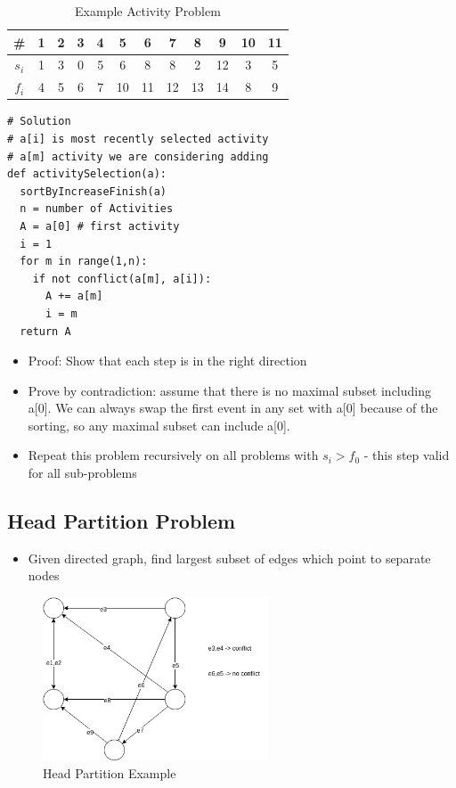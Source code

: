 \documentclass[12pt, letter]{article}
\begin{document}
\begin{table}
\begin{center}
\begin{tabular}{|c|c|c|c|c|c|c|c|c|c|c|c|}
\hline
# & 1 & 2 & 3 & 4 & 5 & 6 & 7 & 8 & 9 & 10 & 11 \\
\hline
$s_i$ & 1 & 3 & 0 & 5 & 6 & 8 & 8 & 2 & 12 & 3 & 5 \\
\hline
$f_i$ & 4 & 5 & 6 & 7 & 10 & 11 & 12 & 13 & 14 & 8 & 9 \\
\hline
\end{tabular}
\end{center}
\caption{Example Activity Problem}
\end{table}

\begin{verbatim}
# Solution
# a[i] is most recently selected activity
# a[m] activity we are considering adding
def activitySelection(a):
  sortByIncreaseFinish(a)
  n = number of Activities
  A = a[0] # first activity
  i = 1
  for m in range(1,n):
    if not conflict(a[m], a[i]):
      A += a[m]
      i = m
  return A
\end{verbatim}

\begin{itemize}
	\item Proof: Show that each step is in the right direction
	\item Prove by contradiction: assume that there is no maximal subset including a[0]. We can always swap the first event in any set with a[0] because of the sorting, so any maximal subset can include a[0].
	\item Repeat this problem recursively on all problems with $s_i > f_0$ - this step valid for all sub-problems
\end{itemize}

\subsection*{Head Partition Problem}
\begin{itemize}
	\item Given directed graph, find largest subset of edges which point to separate nodes
\end{itemize}
\begin{figure}[h]
	\centering
	\includegraphics[width=0.6\textwidth]{head-partition}
	\caption{Head Partition Example}
	\label{fig:head-partition}
\end{figure}
\end{document}
